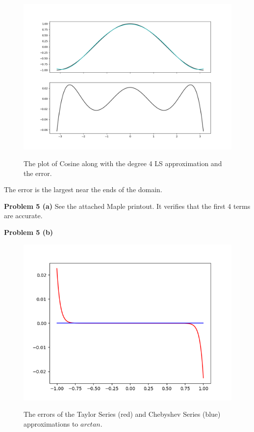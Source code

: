 \documentclass[12pt]{article}
\newcommand{\problem}[1]{\hspace{-4 ex} \large \textbf{Problem #1} }
\begin{document}
	\begin{figure}[h]
		\caption{The plot of Cosine along with the degree 4 LS approximation and the error.}
		\includegraphics[width=1.0\textwidth]{hw6_p4_fig1}
		\label{legendre_approx}
		\centering
	\end{figure}

	The error is the largest near the ends of the domain. 
	
\problem{5 (a)} See the attached Maple printout. It verifies that the first 4 terms are accurate. \\
\cleardoublepage

\problem{5 (b)} 

	\begin{figure}[h]
		\caption{The errors of the Taylor Series (red) and Chebyshev Series (blue) approximations to $arctan$.}
		\includegraphics[width=1.0\textwidth]{hw6_p5_fig1}
		\label{arctan_approx}
		\centering
	\end{figure}
	
\end{document}
